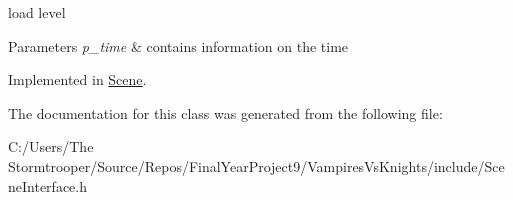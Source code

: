 load level 


\begin{DoxyParams}{Parameters}
{\em p\+\_\+time} & contains information on the time \\
\hline
\end{DoxyParams}


Implemented in \mbox{\hyperlink{class_scene_a27a8b36b21dd9475d47c13db8cfdae64}{Scene}}.



The documentation for this class was generated from the following file\+:\begin{DoxyCompactItemize}
\item 
C\+:/\+Users/\+The Stormtrooper/\+Source/\+Repos/\+Final\+Year\+Project9/\+Vampires\+Vs\+Knights/include/Scene\+Interface.\+h\end{DoxyCompactItemize}
